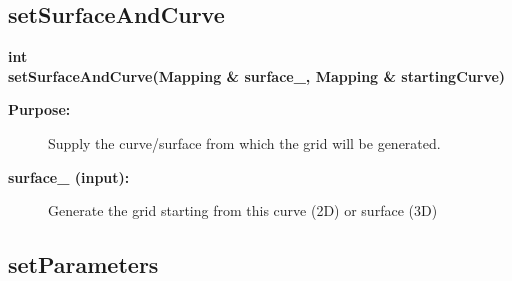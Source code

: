 \subsection{setSurfaceAndCurve}
 
\begin{flushleft} \textbf{%
int  \\ 
\settowidth{\HyperbolicSurfaceMappingIncludeArgIndent}{setSurfaceAndCurve(}%
setSurfaceAndCurve(Mapping \& surface\_, Mapping \& startingCurve)
}\end{flushleft}
\begin{description}
\item[{\bf Purpose:}]  
    Supply the curve/surface from which the grid will be generated.
\item[{\bf surface\_ (input):}]  Generate the grid starting from this curve (2D) or
 surface (3D)
\end{description}
\subsection{setParameters}
 
